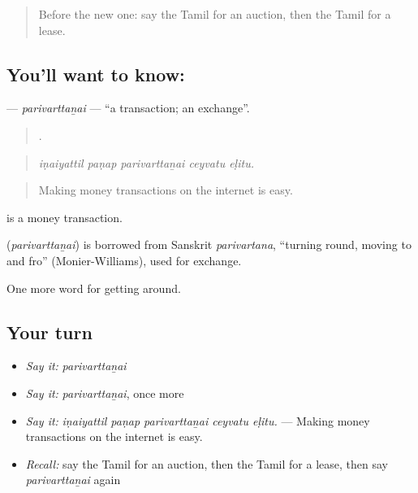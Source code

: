 \label{lesson:TA-C449-parivarttanai}



\begin{quote}
Before the new one: say the Tamil for an auction, then the Tamil for a lease.
\end{quote}

\subsection*{You'll want to know: }
\textbf{} — \emph{parivarttaṉai} — \textquotedblleft{}a transaction; an exchange\textquotedblright{}.

\begin{quote}
    .
\end{quote}

\begin{quote}
\emph{iṇaiyattil paṇap parivarttaṉai ceyvatu eḷitu.}
\end{quote}

\begin{quote}
Making money transactions on the internet is easy.
\end{quote}

  is a money transaction.

\begin{cousinweb}
\textbf{} (\emph{parivarttaṉai}) is borrowed from Sanskrit \emph{parivartana}, \textquotedblleft{}turning round, moving to and fro\textquotedblright{} (Monier-Williams), used for exchange.
\end{cousinweb}

\begin{grammarlens}[title={What you've built}]
One more word for getting around.
\end{grammarlens}

\subsection*{Your turn}
\begin{itemize}
\raggedright
  \item \emph{Say it:} \emph{parivarttaṉai}
  \item \emph{Say it:} \emph{parivarttaṉai}, once more
  \item \emph{Say it:} \emph{iṇaiyattil paṇap parivarttaṉai ceyvatu eḷitu.} — Making money transactions on the internet is easy.
  \item \emph{Recall:} say the Tamil for an auction, then the Tamil for a lease, then say \emph{parivarttaṉai} again
\end{itemize}

